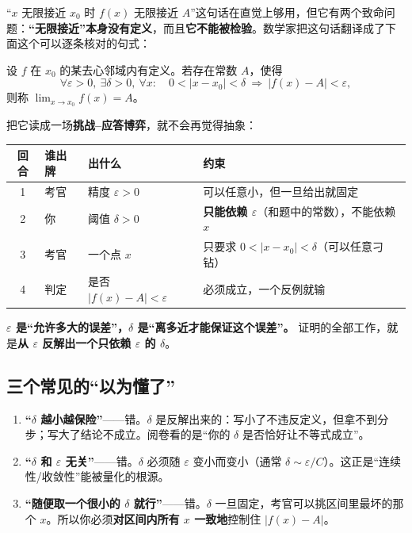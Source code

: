 \documentclass[11pt,a4paper]{ctexart}
\newcommand{\eps}{\varepsilon}
\newcommand{\abs}[1]{\left\lvert #1\right\rvert}
\begin{document}
“$x$ 无限接近 $x_0$ 时 $f(x)$ 无限接近 $A$”这句话在直觉上够用，但它有两个致命问题：\textbf{“无限接近”本身没有定义}，而且\textbf{它不能被检验}。数学家把这句话翻译成了下面这个可以逐条核对的句式：

\begin{keypoint}[极限的定义（$\eps$--$\delta$ 型）]
设 $f$ 在 $x_0$ 的某去心邻域内有定义。若存在常数 $A$，使得
\[
\forall \eps>0,\ \exists \delta>0,\ \forall x:\quad 0<\abs{x-x_0}<\delta \ \Longrightarrow\ \abs{f(x)-A}<\eps,
\]
则称 $\lim_{x\to x_0}f(x)=A$。
\end{keypoint}

把它读成一场\textbf{挑战--应答博弈}，就不会再觉得抽象：

\begin{center}
\small
\begin{tabular}{@{}clll@{}}
\toprule
回合 & 谁出牌 & 出什么 & 约束 \\
\midrule
1 & 考官 & 精度 $\eps>0$ & 可以任意小，但一旦给出就固定 \\
2 & 你 & 阈值 $\delta>0$ & \textbf{只能依赖 $\eps$}（和题中的常数），不能依赖 $x$ \\
3 & 考官 & 一个点 $x$ & 只要求 $0<\abs{x-x_0}<\delta$（可以任意刁钻） \\
4 & 判定 & 是否 $\abs{f(x)-A}<\eps$ & 必须成立，一个反例就输 \\
\bottomrule
\end{tabular}
\end{center}

\begin{methodbox}[一句话记住]
\textbf{$\eps$ 是“允许多大的误差”，$\delta$ 是“离多近才能保证这个误差”。}
证明的全部工作，就是\textbf{从 $\eps$ 反解出一个只依赖 $\eps$ 的 $\delta$}。
\end{methodbox}

\subsection{三个常见的“以为懂了”}

\begin{enumerate}
\item \textbf{“$\delta$ 越小越保险”}——错。$\delta$ 是反解出来的：写小了不违反定义，但拿不到分步；写大了结论不成立。阅卷看的是“你的 $\delta$ 是否恰好让不等式成立”。
\item \textbf{“$\delta$ 和 $\eps$ 无关”}——错。$\delta$ 必须随 $\eps$ 变小而变小（通常 $\delta\sim\eps/C$）。这正是“连续性/收敛性”能被量化的根源。
\item \textbf{“随便取一个很小的 $\delta$ 就行”}——错。$\delta$ 一旦固定，考官可以挑区间里最坏的那个 $x$。所以你必须\textbf{对区间内所有 $x$ 一致地}控制住 $\abs{f(x)-A}$。
\end{enumerate}
\end{document}
